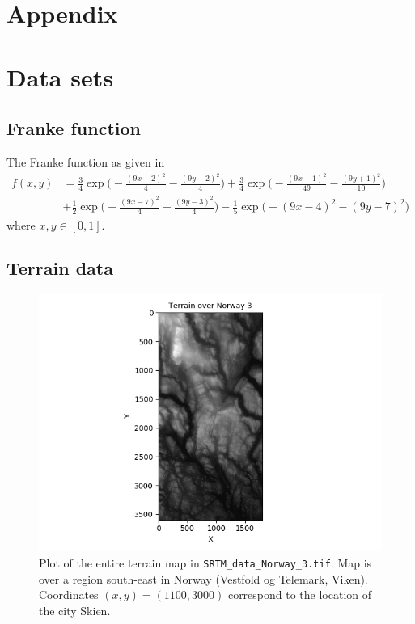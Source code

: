 \documentclass[a4paper]{article}
\begin{document}
\section*{Appendix} \label{chap:appendix}
\section{Data sets} \label{app:datasets}
\subsection{Franke function} \label{app:Franke}
The Franke function as given in \cite{Franke}
\begin{align*}
	f(x,y) &= \frac{3}{4}\exp\bigg(-\frac{(9x-2)^2}{4} - \frac{(9y-2)^2}{4}\bigg)
	+\frac{3}{4}\exp\bigg(-\frac{(9x+1)^2}{49} - \frac{(9y+1)^2}{10}\bigg)\\
	&+\frac{1}{2}\exp\bigg(-\frac{(9x-7)^2}{4} - \frac{(9y-3)^2}{4}\bigg)
	-\frac{1}{5}\exp\big(-(9x-4)^2 - (9y-7)^2\big)
\end{align*}
where $x,y \in [0, 1]$.

\subsection{Terrain data} \label{app:terrain}
\begin{figure}[H]
	\centering
	\includegraphics[scale=0.91]{../figures/task_f/entire_map.png}
	\caption{Plot of the entire terrain map in \texttt{SRTM\_data\_Norway\_3.tif}. Map is over a region south-east in Norway (Vestfold og Telemark, Viken). Coordinates $(x,y) = (1100, 3000)$ correspond to the location of the city Skien.}
	\label{fig:entiremap}
\end{figure}
\end{document}
